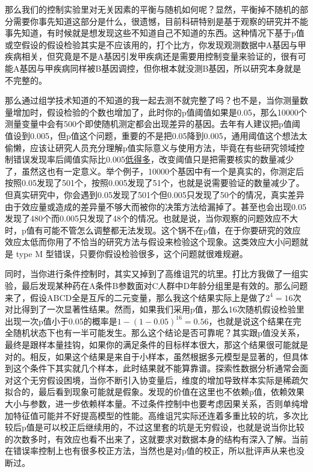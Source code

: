 \documentclass[]{tufte-book}
\begin{document}
那么我们的控制实验里对无关因素的平衡与随机如何呢？显然，平衡掉不随机的部分需要你事先知道这部分是什么，很遗憾，目前科研特别是基于观察的研究并不能事先知道，有时候就是想发现这些不知道自己不知道的东西。这种情况下基于p值或空假设的假设检验其实是不应该用的，打个比方，你发现观测数据中A基因与甲疾病相关，但究竟是不是A基因引发甲疾病还是需要用控制变量来验证的，很有可能A基因与甲疾病同样被B基因调控，但你根本就没测B基因，所以研究本身就是不完整的。

那么通过组学技术知道的不知道的我一起去测不就完整了吗？也不是，当你测量数量增加时，假设检验的个数也增加了，此时你的p值阈值如果是0.05，那么10000个测量变量中会有500个即使随机测定都会出现差异的基因。去年有人建议把p值阈值设到0.005，但p值这个问题，重要的不是把0.05降到0.005，通用阈值这个想法太偷懒，应该让研究人员充分理解p值实际意义与使用方法，毕竟在有些研究领域控制错误发现率后阈值实际比0.005\href{http://www.nature.com/news/one-size-fits-all-threshold-for-p-values-under-fire-1.22625}{低得多}，改变阈值只是把需要核实的数量减少了，虽然这也有一定意义。举个例子，10000个基因中有一个是真实的，你测定后按照0.05发现了501个，按照0.005发现了51个，也就是说需要验证的数量减少了。但真实研究中，你会遇到0.05发现了501个但0.005只发现了50个的情况，真实差异由于效应量或造成的差异量不够大而被你的决策方法给漏掉了。甚至也会出现0.05发现了480个而0.005只发现了48个的情况。也就是说，当你观察的问题效应不大时，p值有可能不管怎么调整都无法发现。这个锅不在p值，在于你要研究的效应效应太低而你用了不恰当的研究方法与假设来检验这个现象。这类效应大小问题就是 type M 型错误，只要你假设检验很多，这个问题就很难规避。

同时，当你进行条件控制时，其实又掉到了高维诅咒的坑里。打比方我做了一组实验，最后发现某种药在A条件B参数面对C人群中D年龄分组里是有效的。那么问题来了，假设ABCD全是互斥的二元变量，那么我这个结果实际上是做了\(2^4 = 16\)次对比得到了一次显著性结果。然而，如果我们采用p值，那么16次随机假设检验里出现一次p值小于0.05的概率是\(1-(1-0.05)^{16} = 0.56\)，也就是说这个结果在完全随机状态下也有一半可能发生。那么这个结论是否可靠呢？其实跟p值没关系，最终是跟样本量挂钩，如果你的满足条件的目标样本很大，那这个结果很可能就是对的。相反，如果这个结果是来自于小样本，虽然根据多元模型是显著的，但具体到这个条件下其实就几个样本，此时结果就不能算靠谱。探索性数据分析通常会面对这个无穷假设困境，当你不断引入协变量后，维度的增加导致样本实际是稀疏欠拟合的，最后看到现象可能就是假象。发现的价值在这里也不依赖p值，依赖效果大小与参数，进一步依赖样本量。不过条件控制中也要考虑因果关系，否则单纯增加特征值可能并不好提高模型的性能。高维诅咒实际还连着多重比较的坑，多次比较后p值是可以校正后继续用的，不过这里套的坑是无穷假设，也就是说当你比较的次数多时，有效应也看不出来了，这就要求对数据本身的结构有深入了解。当前在错误率控制上也有很多校正方法，当然也是对p值的校正，所以批评声从来也没断过。
\end{document}
